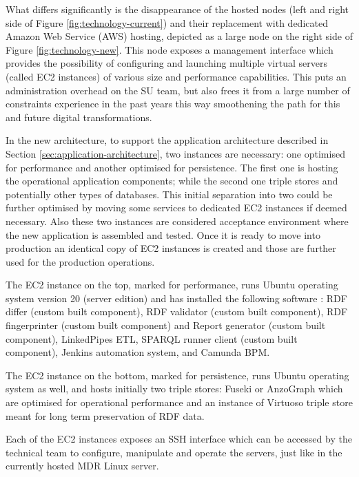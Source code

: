 	What differs significantly is the disappearance of the hosted nodes (left and right side of Figure \ref{fig:technology-current}) and their replacement with dedicated Amazon Web Service (AWS) hosting, depicted as a large node on the right side of Figure \ref{fig:technology-new}. This node exposes a management interface which provides the possibility of configuring and launching multiple virtual servers (called EC2 instances) of various size and performance capabilities. This puts an administration overhead on the SU team, but also frees it from a large number of constraints experience in the past years this way smoothening the path for this and future digital transformations.
	
	In the new architecture, to support the application architecture described in Section \ref{sec:application-architecture}, two instances are necessary: one optimised for performance and another optimised for persistence. The first one is hosting the operational application components; while the second one triple stores and potentially other types of databases. This initial separation into two could be further optimised by moving some services to dedicated EC2 instances if deemed necessary. Also these two instances are considered acceptance environment where the new application is assembled and tested. Once it is ready to move into production an identical copy of EC2 instances is created and those are further used for the production operations. 
	
	The EC2 instance on the top, marked for performance, runs Ubuntu operating system version 20 (server edition) and has installed the following software : RDF differ (custom built component), RDF validator (custom built component), RDF fingerprinter (custom built component) and Report generator (custom built component), LinkedPipes ETL, SPARQL runner client (custom built component), Jenkins automation system, and Camunda BPM. 
	
	The EC2 instance on the bottom, marked for persistence, runs Ubuntu operating system as well, and hosts initially two triple stores: Fuseki or AnzoGraph which are optimised for operational performance and an instance of Virtuoso triple store meant for long term preservation of RDF data. 
	
	Each of the EC2 instances exposes an SSH interface which can be accessed by the technical team to configure, manipulate and operate the servers, just like in the currently hosted MDR Linux server. 
	